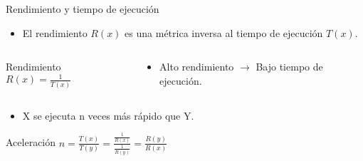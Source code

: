 \begin{frame}[t]{Rendimiento y tiempo de ejecución}
\begin{itemize}
  \item El rendimiento $R(x)$ es una métrica inversa al tiempo de 
        ejecución $T(x)$.
\end{itemize}
\begin{columns}
\begin{column}{.4\textwidth}
\begin{block}{Rendimiento}
\begin{math}
R(x) = \frac{1}{T(x)}
\end{math}
\end{block}
\end{column}
\begin{column}{.6\textwidth}
\begin{itemize}
  \item Alto rendimiento $\rightarrow$ Bajo tiempo de ejecución.
\end{itemize}
\end{column}
\end{columns}
\begin{itemize}
  \item X se ejecuta n veces más rápido que Y.
\end{itemize}
\begin{block}{Aceleración}
\begin{math}
n=\frac{T(x)}{T(y)}=
\frac{
\frac{1}{R(x)}
}{
\frac{1}{R(y)}
}
=
\frac{R(y)}{R(x)}
\end{math}
\end{block}
\end{frame}

